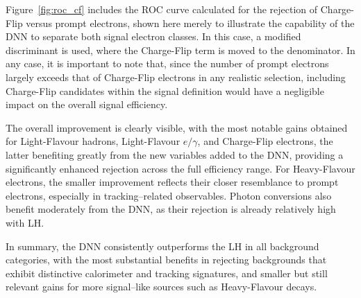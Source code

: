 Figure~\ref{fig:roc_cf} includes the ROC curve calculated for the rejection of Charge-Flip versus prompt electrons, shown here merely to illustrate the capability of the DNN to separate both signal electron classes. In this case, a modified discriminant is used, where the Charge-Flip term is moved to the denominator. In any case, it is important to note that, since the number of prompt electrons largely exceeds that of Charge-Flip electrons in any realistic selection, including Charge-Flip candidates within the signal definition would have a negligible impact on the overall signal efficiency.

The overall improvement is clearly visible, with the most notable gains obtained for Light-Flavour hadrons, Light-Flavour $e/\gamma$, and Charge-Flip electrons, the latter benefiting greatly from the new variables added to the DNN, providing a significantly enhanced rejection across the full efficiency range. For Heavy-Flavour electrons, the smaller improvement reflects their closer resemblance to prompt electrons, especially in tracking–related observables. Photon conversions also benefit moderately from the DNN, as their rejection is already relatively high with LH.

In summary, the DNN consistently outperforms the LH in all background categories, with the most substantial benefits in rejecting backgrounds that exhibit distinctive calorimeter and tracking signatures, and smaller but still relevant gains for more signal–like sources such as Heavy-Flavour decays.


